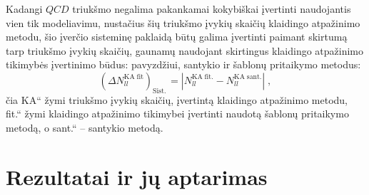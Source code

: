 \documentclass[a4paper, 12pt, oneside]{article}
\newcommand{\ltq}[1]{{\quotedblbase{}#1\textquotedblleft{}}}
\newlength\q
\begin{document}
Kadangi $QCD$ triukšmo negalima pakankamai kokybiškai įvertinti naudojantis vien tik modeliavimu, nustačius šių triukšmo
įvykių skaičių klaidingo atpažinimo metodu, šio įverčio sisteminę paklaidą būtų galima įvertinti paimant skirtumą tarp triukšmo įvykių skaičių,
gaunamų naudojant skirtingus klaidingo atpažinimo tikimybės įvertinimo būdus: pavyzdžiui, santykio ir šablonų pritaikymo metodus:
\begin{equation}
	(\Delta N_{ll}^{\mathrm{KA\; fit}})_{\mathrm{Sist.\,}} = | N_{ll}^{\mathrm{KA \; fit.}} -
	N_{ll}^{\mathrm{KA \; sant.}} | \; ,
	\label{eq:systUncFR}
\end{equation}
čia \ltq{KA} žymi triukšmo įvykių skaičių, įvertintą klaidingo atpažinimo metodu, \ltq{fit.} žymi klaidingo atpažinimo tikimybei
įvertinti naudotą šablonų pritaikymo metodą, o \ltq{sant.} -- santykio metodą.

\section{Rezultatai ir jų aptarimas}
\end{document}
